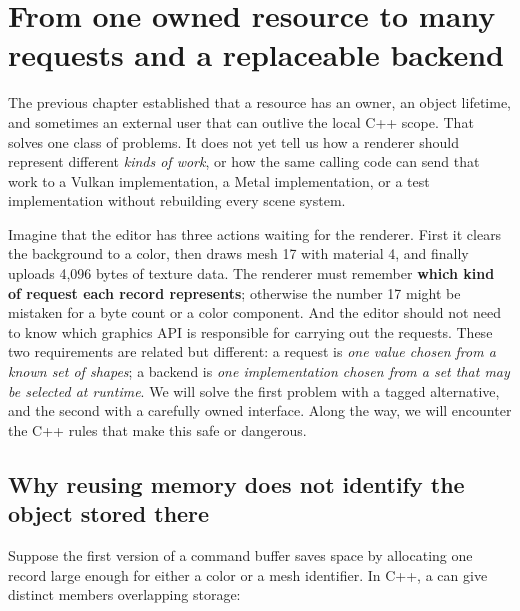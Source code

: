\section{From one owned resource to many requests and a replaceable backend}\label{01-foundations-i-ch004-from-one-owned-resource-to-many-requests-and-a-replaceable-backend}

\hypertarget{01-foundations-i-ch004-from-one-owned-resource-to-many-requests-and-a-replaceable-backend}{}

The previous chapter established that a resource has an owner, an object lifetime, and sometimes an external user that can outlive the local C++ scope. That solves one class of problems. It does not yet tell us how a renderer should represent different \emph{kinds of work}, or how the same calling code can send that work to a Vulkan implementation, a Metal implementation, or a test implementation without rebuilding every scene system.

Imagine that the editor has three actions waiting for the renderer. First it clears the background to a color, then draws mesh 17 with material 4, and finally uploads 4,096 bytes of texture data. The renderer must remember \textbf{which kind of request each record represents}; otherwise the number 17 might be mistaken for a byte count or a color component. And the editor should not need to know which graphics API is responsible for carrying out the requests. These two requirements are related but different: a request is \emph{one value chosen from a known set of shapes}; a backend is \emph{one implementation chosen from a set that may be selected at runtime}. We will solve the first problem with a tagged alternative, and the second with a carefully owned interface. Along the way, we will encounter the C++ rules that make this safe or dangerous.

\subsection{Why reusing memory does not identify the object stored there}\label{01-foundations-i-ch004-why-reusing-memory-does-not-identify-the-object-stored-there}

\hypertarget{01-foundations-i-ch004-why-reusing-memory-does-not-identify-the-object-stored-there}{}

Suppose the first version of a command buffer saves space by allocating one record large enough for either a color or a mesh identifier. In C++, a  can give distinct members overlapping storage:

